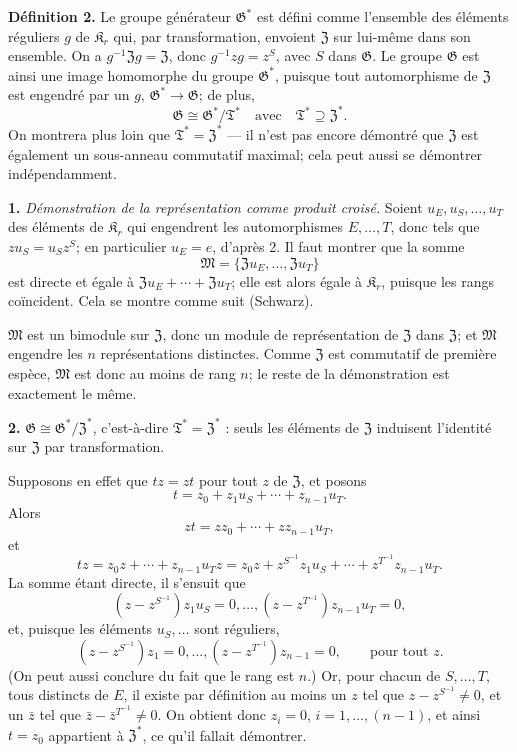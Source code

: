 \noindent\textbf{Définition 2.} Le groupe générateur \(\mathfrak G^*\) est défini comme l'ensemble des éléments réguliers \(g\) de \(\mathfrak K_r\) qui, par transformation, envoient \(\mathfrak Z\) sur lui-même dans son ensemble. On a \(g^{-1}\mathfrak Zg=\mathfrak Z\), donc \(g^{-1}zg=z^S\), avec \(S\) dans \(\mathfrak G\). Le groupe \(\mathfrak G\) est ainsi une image homomorphe du groupe \(\mathfrak G^*\), puisque tout automorphisme de \(\mathfrak Z\) est engendré par un \(g\), \(\mathfrak G^*\to\mathfrak G\); de plus,
\[
\mathfrak G\cong\mathfrak G^*/\mathfrak T^*
\quad\text{avec}\quad
\mathfrak T^*\supseteq\mathfrak Z^*.
\]
On montrera plus loin que \(\mathfrak T^*=\mathfrak Z^*\) --- il n'est pas encore démontré que \(\mathfrak Z\) est également un sous-anneau commutatif maximal; cela peut aussi se démontrer indépendamment.

\noindent\textbf{1.} \emph{Démonstration de la représentation comme produit croisé.} Soient \(u_E,u_S,\ldots,u_T\) des éléments de \(\mathfrak K_r\) qui engendrent les automorphismes \(E,\ldots,T\), donc tels que \(zu_S=u_Sz^S\); en particulier \(u_E=e\), d'après 2. Il faut montrer que la somme
\[
\mathfrak M=\{\mathfrak Zu_E,\ldots,\mathfrak Zu_T\}
\]
est directe et égale à \(\mathfrak Zu_E+\cdots+\mathfrak Zu_T\); elle est alors égale à \(\mathfrak K_r\), puisque les rangs coïncident. Cela se montre comme suit (Schwarz).

\(\mathfrak M\) est un bimodule sur \(\mathfrak Z\), donc un module de représentation de \(\mathfrak Z\) dans \(\mathfrak Z\); et \(\mathfrak M\) engendre les \(n\) représentations distinctes. Comme \(\mathfrak Z\) est commutatif de première espèce, \(\mathfrak M\) est donc au moins de rang \(n\); le reste de la démonstration est exactement le même.

\noindent\textbf{2.} \(\mathfrak G\cong\mathfrak G^*/\mathfrak Z^*\), c'est-à-dire \(\mathfrak T^*=\mathfrak Z^*\) : seuls les éléments de \(\mathfrak Z\) induisent l'identité sur \(\mathfrak Z\) par transformation.

Supposons en effet que \(tz=zt\) pour tout \(z\) de \(\mathfrak Z\), et posons
\[
t=z_0+z_1u_S+\cdots+z_{n-1}u_T.
\]
Alors
\[
zt=zz_0+\cdots+zz_{n-1}u_T,
\]
et
\[
tz=z_0z+\cdots+z_{n-1}u_Tz
=z_0z+z^{S^{-1}}z_1u_S+\cdots+z^{T^{-1}}z_{n-1}u_T.
\]
La somme étant directe, il s'ensuit que
\[
(z-z^{S^{-1}})z_1u_S=0,\ldots,
(z-z^{T^{-1}})z_{n-1}u_T=0,
\]
et, puisque les éléments \(u_S,\ldots\) sont réguliers,
\[
(z-z^{S^{-1}})z_1=0,\ldots,
(z-z^{T^{-1}})z_{n-1}=0,
\qquad\text{pour tout }z.
\]
(On peut aussi conclure du fait que le rang est \(n\).) Or, pour chacun de \(S,\ldots,T\), tous distincts de \(E\), il existe par définition au moins un \(z\) tel que \(z-z^{S^{-1}}\neq0\), et un \(\bar z\) tel que \(\bar z-\bar z^{T^{-1}}\neq0\). On obtient donc \(z_i=0\), \(i=1,\ldots,(n-1)\), et ainsi \(t=z_0\) appartient à \(\mathfrak Z^*\), ce qu'il fallait démontrer.

